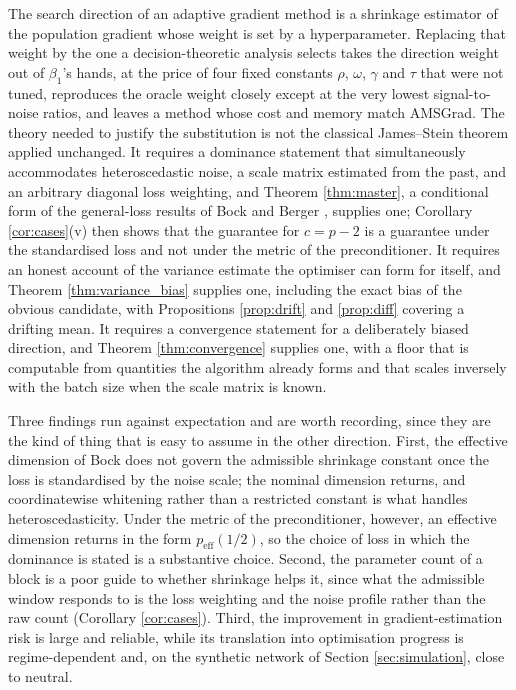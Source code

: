 \documentclass[pdflatex,sn-mathphys-num]{sn-jnl}%
\theoremstyle{thmstyleone}%
\theoremstyle{thmstyletwo}%
\theoremstyle{thmstylethree}%
\newcommand{\rev}[1]{#1}
\newcommand{\peffq}[1]{p_{\mathrm{eff}}(#1)}
\begin{document}
The search direction of an adaptive gradient method is a shrinkage estimator of the population gradient whose weight is set by a hyperparameter. Replacing that weight by the one a decision-theoretic analysis selects \rev{takes the direction weight out of $\beta_1$'s hands, at the price of four fixed constants $\rho$, $\omega$, $\gamma$ and $\tau$ that were not tuned}, reproduces the oracle weight closely except at the very lowest signal-to-noise ratios, and leaves a method whose cost and memory match AMSGrad. The theory needed to justify the substitution is not the classical James--Stein theorem applied unchanged. It requires a dominance statement that simultaneously accommodates heteroscedastic noise, a scale matrix estimated from the past, and \rev{an arbitrary diagonal loss weighting, and Theorem \ref{thm:master}, a conditional form of the general-loss results of Bock \cite{bock1975} and Berger \cite{berger1976jmva}, supplies one; Corollary \ref{cor:cases}(v) then shows that the guarantee for $c=p-2$ is a guarantee under the standardised loss and not under the metric of the preconditioner.} It requires an honest account of the variance estimate the optimiser can form for itself, and Theorem \ref{thm:variance_bias} supplies one, including the exact bias of the obvious candidate\rev{, with Propositions \ref{prop:drift} and \ref{prop:diff} covering a drifting mean}. It requires a convergence statement for a deliberately biased direction, and Theorem \ref{thm:convergence} supplies one, with a floor that is computable from quantities the algorithm already forms and that scales inversely with the batch size\rev{ when the scale matrix is known}.

Three findings run against expectation and are worth recording, since they are the kind of thing that is easy to assume in the other direction. First, the effective dimension of Bock \cite{bock1975} does not govern the admissible shrinkage constant once the loss is standardised by the noise scale; the nominal dimension returns, and coordinatewise whitening rather than a restricted constant is what handles heteroscedasticity\rev{. Under the metric of the preconditioner, however, an effective dimension returns in the form $\peffq{1/2}$, so the choice of loss in which the dominance is stated is a substantive choice}. Second, the parameter count of a block is a poor guide to whether shrinkage helps it, since what the admissible window responds to is the loss weighting and the noise profile rather than the raw count (Corollary \ref{cor:cases}). Third, the improvement in gradient-estimation risk is large and reliable, while its translation into optimisation progress is regime-dependent and, on the synthetic network of Section \ref{sec:simulation}, close to neutral.
\end{document}
